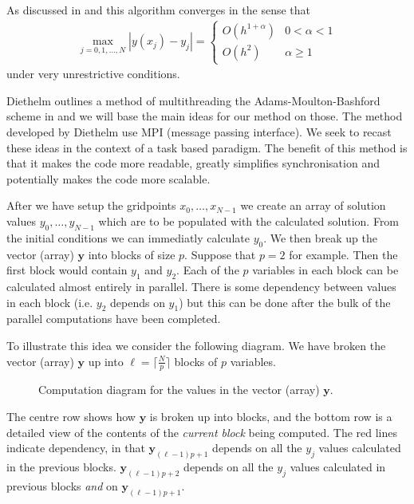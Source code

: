 As discussed in \cite{Diethelm2004} and \cite{Diethelm2011} this algorithm converges in the sense that
\begin{align}
    \max_{j=0,1,\ldots,N} |y(x_j) - y_j| = 
    \begin{cases}
        O(h^{1+\alpha}) & 0 < \alpha < 1 \\
        O(h^2) & \alpha \geq 1
    \end{cases}
\end{align}
under very unrestrictive conditions.

Diethelm outlines a method of multithreading the Adams-Moulton-Bashford scheme in \cite{Diethelm2011} and we will base the main ideas for our method on those. The method developed by Diethelm use MPI (message passing interface). We seek to recast these ideas in the context of a task based paradigm. The benefit of this method is that it makes the code more readable, greatly simplifies synchronisation and potentially makes the code more scalable. 

After we have setup the gridpoints $ x_0, \ldots, x_{N-1} $ we create an array of solution values $ y_0, \ldots, y_{N-1} $ which are to be populated with the calculated solution. From the initial conditions we can immediatly calculate $ y_0 $. We then break up the vector (array) $ \mathbf{y} $ into blocks of size $ p $. Suppose that $ p = 2 $ for example. Then the first block would contain $ y_1 $ and $ y_2 $. Each of the $ p $ variables in each block can be calculated almost entirely in parallel. There is some dependency between values in each block (i.e. $ y_2 $ depends on $ y_1 $) but this can be done after the bulk of the parallel computations have been completed.

To illustrate this idea we consider the following diagram. We have broken the vector (array) $ \mathbf{y} $ up into
$ \ell = \lceil \frac{N}{p} \rceil $ blocks of $ p $ variables.
\begin{figure}[h]

    
    \caption{Computation diagram for the values in the vector (array) $ \mathbf{y} $.}
\end{figure} The centre row shows how $ \mathbf{y} $ is broken up into blocks, and the bottom row is a detailed view
of the contents of the \emph{current block} being computed.
The red lines indicate dependency, in that $ \mathbf{y}_{(\ell - 1)p + 1} $ depends on all the $ y_j $ values calculated in the previous blocks. $ \mathbf{y}_{(\ell - 1)p + 2} $ depends on all the $ y_j $ values calculated in previous blocks \emph{and} on $ \mathbf{y}_{(\ell - 1)p + 1 } $. 

